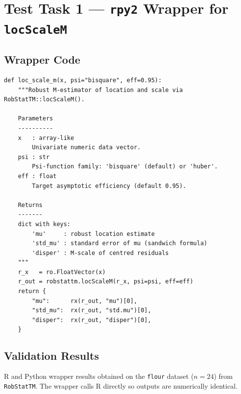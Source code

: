 \documentclass[11pt]{article}
\begin{document}
\section{Test Task 1 --- \texttt{rpy2} Wrapper for \texttt{locScaleM}}

\subsection{Wrapper Code}

\begin{lstlisting}[style=python, caption={rpy2 wrapper for locScaleM (robust location and scale)}]
def loc_scale_m(x, psi="bisquare", eff=0.95):
    """Robust M-estimator of location and scale via RobStatTM::locScaleM().

    Parameters
    ----------
    x   : array-like
        Univariate numeric data vector.
    psi : str
        Psi-function family: 'bisquare' (default) or 'huber'.
    eff : float
        Target asymptotic efficiency (default 0.95).

    Returns
    -------
    dict with keys:
        'mu'     : robust location estimate
        'std_mu' : standard error of mu (sandwich formula)
        'disper' : M-scale of centred residuals
    """
    r_x   = ro.FloatVector(x)
    r_out = robstattm.locScaleM(r_x, psi=psi, eff=eff)
    return {
        "mu":      rx(r_out, "mu")[0],
        "std_mu":  rx(r_out, "std.mu")[0],
        "disper":  rx(r_out, "disper")[0],
    }
\end{lstlisting}

\subsection{Validation Results}

R and Python wrapper results obtained on the \texttt{flour} dataset
($n = 24$) from \texttt{RobStatTM}. The wrapper calls R directly so
outputs are numerically identical.
\end{document}
